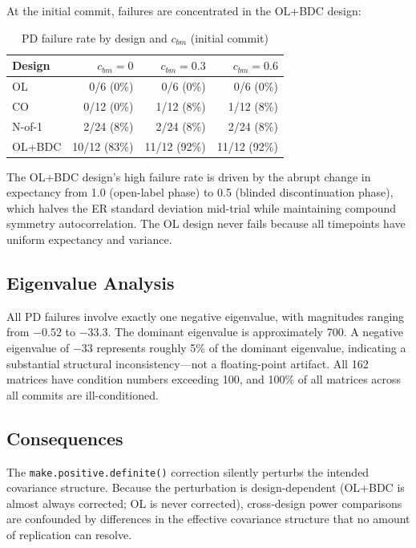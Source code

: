 \documentclass[11pt]{article}
\begin{document}
At the initial commit, failures are concentrated in the OL+BDC
design:

\begin{table}[h]
\centering
\caption{PD failure rate by design and $c_{bm}$ (initial
  commit)}
\begin{tabular}{lrrr}
\toprule
Design & $c_{bm} = 0$ & $c_{bm} = 0.3$ &
  $c_{bm} = 0.6$ \\
\midrule
OL & 0/6 (0\%) & 0/6 (0\%) & 0/6 (0\%) \\
CO & 0/12 (0\%) & 1/12 (8\%) & 1/12 (8\%) \\
N-of-1 & 2/24 (8\%) & 2/24 (8\%) & 2/24 (8\%) \\
OL+BDC & 10/12 (83\%) & 11/12 (92\%) & 11/12 (92\%) \\
\bottomrule
\end{tabular}
\label{tab:pd_design}
\end{table}

The OL+BDC design's high failure rate is driven by the abrupt
change in expectancy from 1.0 (open-label phase) to 0.5
(blinded discontinuation phase), which halves the ER standard
deviation mid-trial while maintaining compound symmetry
autocorrelation. The OL design never fails because all
timepoints have uniform expectancy and variance.

\subsection{Eigenvalue Analysis}

All PD failures involve exactly one negative eigenvalue, with
magnitudes ranging from $-0.52$ to $-33.3$. The dominant
eigenvalue is approximately 700. A negative eigenvalue of
$-33$ represents roughly 5\% of the dominant eigenvalue,
indicating a substantial structural inconsistency---not a
floating-point artifact. All 162 matrices have condition
numbers exceeding 100, and 100\% of all matrices across all
commits are ill-conditioned.

\subsection{Consequences}

The \texttt{make.positive.definite()} correction silently
perturbs the intended covariance structure. Because the
perturbation is design-dependent (OL+BDC is almost always
corrected; OL is never corrected), cross-design power
comparisons are confounded by differences in the effective
covariance structure that no amount of replication can resolve.
\end{document}
